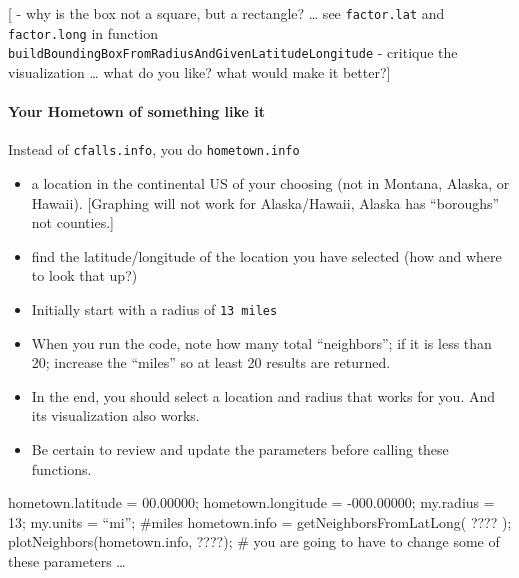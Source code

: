 \documentclass[
]{article}
\newenvironment{Shaded}{\begin{snugshade}}{\end{snugshade}}
\newcommand{\CommentTok}[1]{\textcolor[rgb]{0.56,0.35,0.01}{\textit{#1}}}
\newcommand{\DecValTok}[1]{\textcolor[rgb]{0.00,0.00,0.81}{#1}}
\newcommand{\FloatTok}[1]{\textcolor[rgb]{0.00,0.00,0.81}{#1}}
\newcommand{\NormalTok}[1]{#1}
\newcommand{\StringTok}[1]{\textcolor[rgb]{0.31,0.60,0.02}{#1}}
\providecommand{\tightlist}{%
  \setlength{\itemsep}{0pt}\setlength{\parskip}{0pt}}
\begin{document}
{[} - why is the box not a square, but a rectangle? \ldots{} see
\texttt{factor.lat} and \texttt{factor.long} in function
\texttt{buildBoundingBoxFromRadiusAndGivenLatitudeLongitude} - critique
the visualization \ldots{} what do you like? what would make it
better?{]}

\hypertarget{your-hometown-of-something-like-it}{%
\paragraph{Your Hometown of something like
it}\label{your-hometown-of-something-like-it}}

Instead of \texttt{cfalls.info}, you do \texttt{hometown.info}

\begin{itemize}
\tightlist
\item
  a location in the continental US of your choosing (not in Montana,
  Alaska, or Hawaii). {[}Graphing will not work for Alaska/Hawaii,
  Alaska has ``boroughs'' not counties.{]}
\item
  find the latitude/longitude of the location you have selected (how and
  where to look that up?)
\item
  Initially start with a radius of \texttt{13\ miles}
\item
  When you run the code, note how many total ``neighbors''; if it is
  less than 20; increase the ``miles'' so at least 20 results are
  returned.
\item
  In the end, you should select a location and radius that works for
  you. And its visualization also works.
\item
  Be certain to review and update the parameters before calling these
  functions.
\end{itemize}

hometown.latitude = 00.00000; hometown.longitude = -000.00000; my.radius
= 13; my.units = ``mi''; \#miles hometown.info =
getNeighborsFromLatLong( ???? ); plotNeighbors(hometown.info, ????); \#
you are going to have to change some of these parameters \ldots{}

\begin{Shaded}
\end{Shaded}
\end{document}
